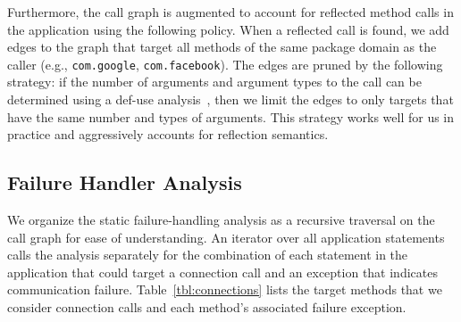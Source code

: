 Furthermore, the call graph is augmented to account for reflected
method calls in the application using the following policy.  When a
reflected call is found, we add edges to the graph that target all
methods of the same package domain as the caller (e.g.,
\lstinline!com.google!, \lstinline!com.facebook!).  The edges are pruned by the
following strategy: if the number of arguments and argument types to
the call can be determined using a def-use analysis~\cite{Aho2006},
then we limit the edges to only targets that have the same number and
types of arguments.  This strategy works well for us in
practice and aggressively accounts for reflection semantics.


\subsection{Failure Handler Analysis}

We organize the static failure-handling analysis as a recursive
traversal on the call graph for ease of understanding.  An iterator
over all application statements calls the analysis separately for the
combination of each statement in the application that could target a
connection call and an exception that indicates communication failure.
Table~\ref{tbl:connections} lists the target methods that we consider
connection calls and each method's associated failure exception.

